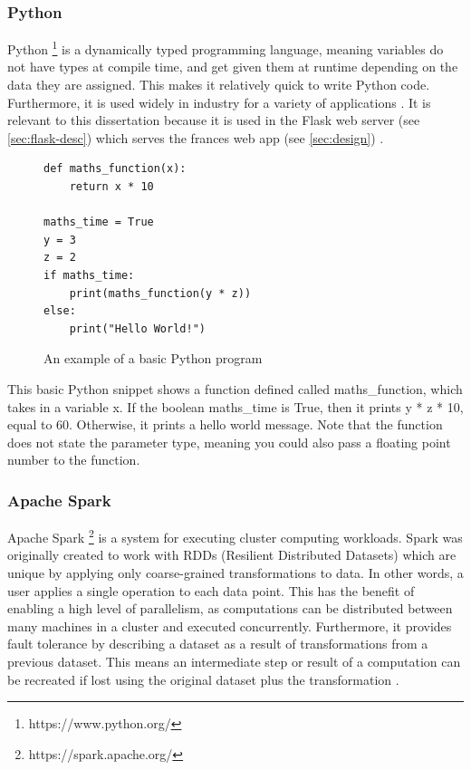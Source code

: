 \documentclass[12pt, letterpaper]{article}
\begin{document}
\subsubsection{Python}\label{sec:python-desc}

\begin{flushleft}
Python \footnote{https://www.python.org/} is a dynamically typed programming language, meaning variables do not have types at compile time, and get given them at runtime depending on the data they are assigned. This makes it relatively quick to write Python code. Furthermore, it is used widely in industry for a variety of applications \cite{python-desc}. It is relevant to this dissertation because it is used in the Flask web server (see \ref{sec:flask-desc}) which serves the frances web app (see \ref{sec:design}) .
\end{flushleft}

\begin{flushleft}
\begin{figure}[H]
\begin{verbatim}
def maths_function(x):
    return x * 10

maths_time = True
y = 3
z = 2
if maths_time:
    print(maths_function(y * z))
else:
    print("Hello World!")
\end{verbatim}
\caption{An example of a basic Python program}
\end{figure}
\end{flushleft}

\begin{flushleft}
This basic Python snippet shows a function defined called maths\_function, which takes in a variable x. If the boolean maths\_time is True, then it prints y * z * 10, equal to 60. Otherwise, it prints a hello world message. Note that the function does not state the parameter type, meaning you could also pass a floating point number to the function.
\end{flushleft}

\subsubsection{Apache Spark}\label{sec:spark-desc}

Apache Spark
\footnote{https://spark.apache.org/}
is a system for executing cluster computing workloads. Spark was originally created to work with RDDs (Resilient Distributed Datasets) which are unique by applying only coarse-grained transformations to data. In other words, a user applies a single operation to each data point. This has the benefit of enabling a high level of parallelism, as computations can be distributed between many machines in a cluster and executed concurrently. Furthermore, it provides fault tolerance by describing a dataset as a result of transformations from a previous dataset. This means an intermediate step or result of a computation can be recreated if lost using the original dataset plus the transformation  \cite{spark-rdds}.
\end{document}
